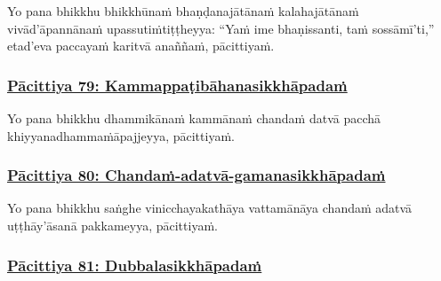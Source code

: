 Yo pana bhikkhu bhikkhūnaṁ bhaṇḍanajātānaṁ kalahajātānaṁ vivād'āpannānaṁ upassutiṁ\makeatletter\hyperlink{endnote404-appendix}\makeatother \thinspace tiṭṭheyya: ``Yaṁ ime bhaṇissanti, taṁ sossāmī'ti,'' etad'eva paccayaṁ karitvā anaññaṁ, pācittiyaṁ.



\subsubsection*{\hyperref[exp79]{Pācittiya 79: Kammappaṭibāhanasikkhāpadaṁ}}
\label{pac79}

Yo pana bhikkhu dhammikānaṁ kammānaṁ chandaṁ datvā pacchā khiyyanadhammaṁ\makeatletter\hyperlink{endnote405-appendix}\makeatother \thinspace āpajjeyya, pācittiyaṁ.



\subsubsection*{\hyperref[exp80]{Pācittiya 80: Chandaṁ-adatvā-gamanasikkhāpadaṁ}}
\label{pac80}

Yo pana bhikkhu saṅghe vinicchayakathāya vattamānāya chandaṁ adatvā uṭṭhāy'āsanā pakkameyya, pācittiyaṁ.



\subsubsection*{\hyperref[exp81]{Pācittiya 81: Dubbalasikkhāpadaṁ}}
\label{pac81}

